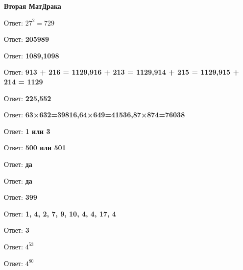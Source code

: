 \centerline{\bf \Huge Вторая МатДрака}

 Ответ: \textbf{$27^2=729$}

 Ответ: \textbf{205989}

 Ответ: \textbf{1089,1098}

 Ответ: \textbf{913 + 216 = 1129,916 + 213 = 1129,914 + 215 = 1129,915 + 214 = 1129}

 Ответ: \textbf{225,552}

 Ответ: \textbf{63×632=39816,64×649=41536,87×874=76038}

 Ответ: \textbf{1 или 3}

 Ответ: \textbf{500 или 501}

 Ответ: \textbf{да}

 Ответ: \textbf{да}

 Ответ: \textbf{399}

 Ответ: \textbf{1, 4, 2, 7, 9, 10, 4, 4, 17, 4}

 Ответ: \textbf{3}

 Ответ: \textbf{$4^{53}$}

 Ответ: \textbf{$4^{80}$}

